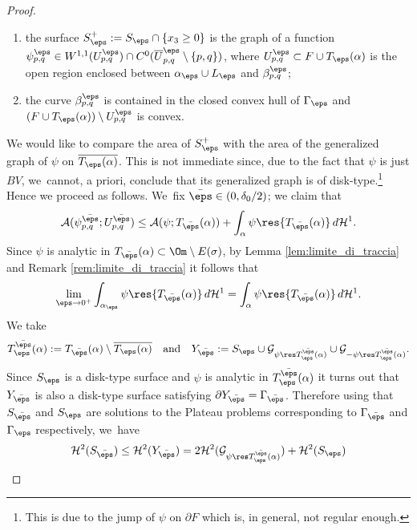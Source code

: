 \begin{proof}
\begin{enumerate}[{\rm (1)},wide]
\item the surface $S^+_\eps:=S_\eps\cap\{x_3\ge0\}$
is the graph of a function $\psi_{p,q}^\eps\in W^{1,1}( U_{p,q}^\eps)
\cap C^0(\overline U_{p,q}^\eps\setminus\{p,q\})$, where $U_{p,q}^\eps\subset F\cup T_\eps(\alpha)$ is the open region enclosed between $\alpha_\eps\cup L_\eps$ and $\beta_{p,q}^{\eps}$;
\item the curve $\beta_{p,q}^\eps$ is contained in the closed
convex hull of $\Gamma_\eps$ and $( F\cup T_\eps(\alpha))\setminus U_{p,q}^\eps$ is convex.
\end{enumerate}
We would like to compare the area of $S_\eps^+$ with the area of the generalized graph of $\psi$ on $\overline {T_\eps(\alpha)}$. This is not immediate since, due to the fact that $\psi$ is just $BV$, we~cannot, a priori, conclude that its generalized graph is of disk-type.\footnote{This is due to the jump of $\psi$ on $\partial F$ which is, in general, not regular enough.} Hence we proceed as follows. We~fix $\bar\eps\in(0,\delta_0/2)$; we claim that
\begin{equation}\label{eq:comparison-with-plateau}
\mathcal{A}(\psi_{p,q}^{\bar\eps}; U_{p,q}^{\bar\eps})
\le
\mathcal{A}(\psi; T_{\bar\eps}(\alpha))+
\int_{\alpha}\psi\res{T_{\bar\eps}(\alpha)}\,d\mathcal{H}^1.
\end{equation}
Since $\psi$ is analytic in $T_{\bar\eps}(\alpha)\subset\Om\setminus E(\sigma)$, by Lemma \ref{lem:limite_di_traccia} and Remark \ref{rem:limite_di_traccia} it follows that
\begin{equation}\label{claim}
\lim_{\eps\to0^+}
\int_{\alpha_\eps}\psi\res{T_{\bar\eps}(\alpha)}\,d\mathcal{H}^1=\int_{\alpha}\psi\res{T_{\bar\eps}(\alpha)}\,d\mathcal{H}^1.
\end{equation}
We take
\[
T_{\eps}^{\bar\eps}(\alpha):={T_{\bar\eps}(\alpha)\setminus \overline {T_{\eps}(\alpha)}}\quad\text{and}\quad Y_{\bar\eps}:=S_{\eps}\cup\mathcal{G}_{\psi\res T_\eps^{\bar\eps}(\alpha)} \cup\mathcal{G}_{-\psi\res T_\eps^{\bar\eps}(\alpha)}.
\]
Since $S_\eps$ is a disk-type surface and $\psi$ is analytic in $T_\eps^{\bar\eps}(\alpha)$ it turns out that $Y_{\bar\eps}$ is also a disk-type surface satisfying $\partial Y_{\bar\eps}=\Gamma_{\bar\eps}$. Therefore using that $S_{\bar\eps}$ and $S_\eps$ are solutions to the Plateau problems corresponding to $\Gamma_{\bar\eps}$ and $\Gamma_\eps$ respectively, we~have
\begin{equation*}
\begin{split}
\mathcal{H}^2(S_{\bar\eps})\le \mathcal{H}^2(Y_{\bar\eps})&= 2\mathcal{H}^2(\mathcal{G}_{\psi\res T_\eps^{\bar\eps}(\alpha)} )+\mathcal{H}^2(S_\eps)\\

\end{split}
\end{equation*}
\end{proof}
